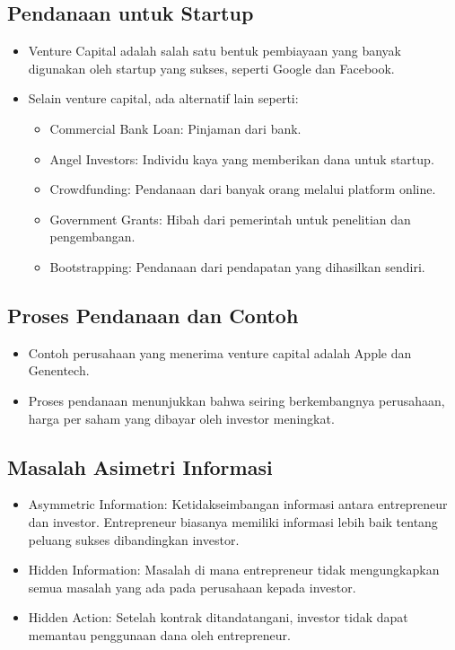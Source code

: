 \documentclass{article}
\begin{document}
\subsection{Pendanaan untuk Startup}
\begin{itemize}
    \item Venture Capital adalah salah satu bentuk pembiayaan yang banyak digunakan oleh startup yang sukses, seperti Google dan Facebook.
    \item Selain venture capital, ada alternatif lain seperti:
          \begin{itemize}
              \item Commercial Bank Loan: Pinjaman dari bank.
              \item Angel Investors: Individu kaya yang memberikan dana untuk startup.
              \item Crowdfunding: Pendanaan dari banyak orang melalui platform online.
              \item Government Grants: Hibah dari pemerintah untuk penelitian dan pengembangan.
              \item Bootstrapping: Pendanaan dari pendapatan yang dihasilkan sendiri.
          \end{itemize}

\end{itemize}

\subsection{Proses Pendanaan dan Contoh}
\begin{itemize}
    \item Contoh perusahaan yang menerima venture capital adalah Apple dan Genentech.
    \item Proses pendanaan menunjukkan bahwa seiring berkembangnya perusahaan, harga per saham yang dibayar oleh investor meningkat.
\end{itemize}

\subsection{Masalah Asimetri Informasi}
\begin{itemize}
    \item Asymmetric Information: Ketidakseimbangan informasi antara entrepreneur dan investor. Entrepreneur biasanya memiliki informasi lebih baik tentang peluang sukses dibandingkan investor.
    \item Hidden Information: Masalah di mana entrepreneur tidak mengungkapkan semua masalah yang ada pada perusahaan kepada investor.
    \item Hidden Action: Setelah kontrak ditandatangani, investor tidak dapat memantau penggunaan dana oleh entrepreneur.
\end{itemize}
\end{document}
